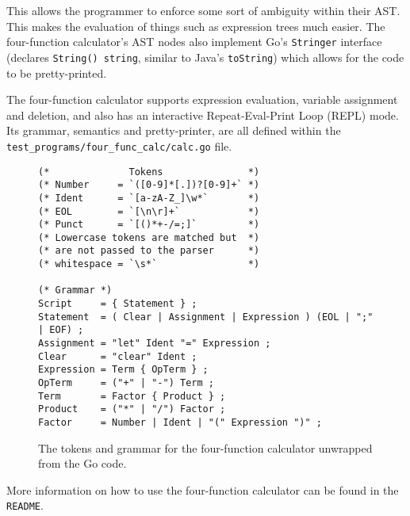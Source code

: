 This allows the programmer to enforce some sort of ambiguity within their AST. This makes the evaluation of things such as expression trees much easier. The four-function calculator's AST nodes also implement Go's \texttt{Stringer} interface (declares \texttt{String() string}, similar to Java's \verb|toString|) which allows for the code to be pretty-printed.

The four-function calculator supports expression evaluation, variable assignment and deletion, and also has an interactive Repeat-Eval-Print Loop (REPL) mode. Its grammar, semantics and pretty-printer, are all defined within the \verb|test_programs/four_func_calc/calc.go| file.

\begin{figure}[H]
    \begin{verbatim}
(*              Tokens               *)
(* Number     = `([0-9]*[.])?[0-9]+` *)
(* Ident      = `[a-zA-Z_]\w*`       *)
(* EOL        = `[\n\r]+`            *)
(* Punct      = `[()*+-/=;]`         *)
(* Lowercase tokens are matched but  *)
(* are not passed to the parser      *)
(* whitespace = `\s*`                *)

(* Grammar *)
Script     = { Statement } ;
Statement  = ( Clear | Assignment | Expression ) (EOL | ";" | EOF) ;
Assignment = "let" Ident "=" Expression ;
Clear      = "clear" Ident ;
Expression = Term { OpTerm } ;
OpTerm     = ("+" | "-") Term ;
Term       = Factor { Product } ;
Product    = ("*" | "/") Factor ;
Factor     = Number | Ident | "(" Expression ")" ;
    \end{verbatim}
    \cprotect\caption{The tokens and grammar for the four-function calculator unwrapped from the Go code.}
\end{figure}

More information on how to use the four-function calculator can be found in the \verb|README|.
